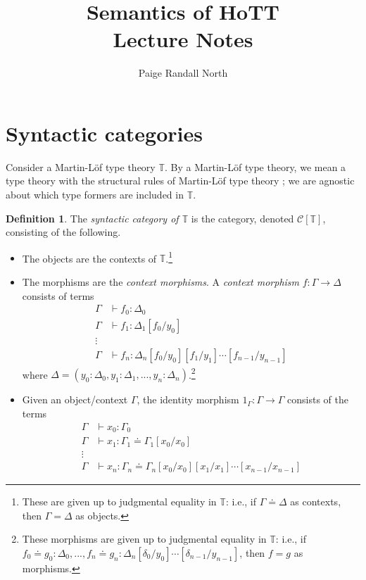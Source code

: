 \documentclass{article}
\title{Semantics of HoTT \\ Lecture Notes}
\author{Paige Randall North}
\theoremstyle{definition}
\newtheorem{definition}{Definition}[section]
\theoremstyle{theorem}
\newcommand{\T}{\mathbb T}
\newcommand{\C}{\mathcal C}
\newcommand{\syncat}[1]{\C [#1]}
\newcommand{\seq}{\doteq}
\begin{document}
\maketitle

\section{Syntactic categories}

Consider a Martin-Löf type theory $\T$. By a Martin-Löf type theory, we mean a type theory with the structural rules of Martin-Löf type theory \cite{hofmann}; we are agnostic about which type formers are included in $\T$.

\begin{definition}
    The \emph{syntactic category of $\T$} is the category, denoted $\syncat{\T}$, consisting of the following.
    \begin{itemize}
        \item The objects are the contexts of $\T$.\footnote{These are given up to judgmental equality in $\T$: i.e., if $\Gamma \seq \Delta$ as contexts, then $\Gamma = \Delta$ as objects.}
        \item The morphisms are the \emph{context morphisms}. A \emph{context morphism} $f : \Gamma \to \Delta$ consists of terms
        \begin{align*}
            \Gamma &\vdash f_0 : \Delta_0 \\
            \Gamma &\vdash f_1 : \Delta_1[f_0 / y_0] \\
            \vdots \\
            \Gamma &\vdash f_n : \Delta_n [f_0 / y_0] [f_1 / y_1] \cdots [f_{n-1} / y_{n-1}]
        \end{align*}
        where $\Delta = (y_0 : \Delta_0 , y_1 : \Delta_1, ... , y_n : \Delta_n)$.\footnote{These morphisms are given up to judgmental equality in $\T$: i.e., if $f_0 \seq g_0 : \Delta_0, ..., f_n \seq g_n : \Delta_n [\delta_0 / y_0] \cdots [\delta_{n-1} / y_{n-1}]$, then $f = g$ as morphisms.}
        \item Given an object/context $\Gamma$, the identity morphism $1_\Gamma : \Gamma \to \Gamma$ consists of the terms
        \begin{align*}
            \Gamma &\vdash x_0 : \Gamma_0 \\
            \Gamma &\vdash x_1 : \Gamma_1 \seq \Gamma_1[x_0 / x_0] \\
            \vdots \\
            \Gamma &\vdash x_n : \Gamma_n \seq \Gamma_n [x_0 / x_0] [x_1 / x_1] \cdots [x_{n-1} / x_{n-1}]

\end{align*}
\end{itemize}
\end{definition}
\end{document}
